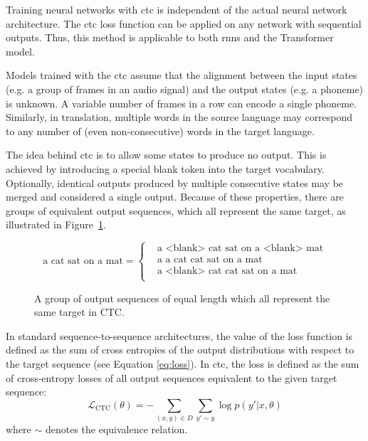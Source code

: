 Training neural networks with \ac{ctc} is independent of the actual neural
network architecture. The \ac{ctc} loss function can be applied on any network
with sequential outputs. Thus, this method is applicable to both \acp{rnn} and
the Transformer model.

Models trained with the \ac{ctc} assume that the alignment between the input
states (e.g. a group of frames in an audio signal) and the output states
(e.g. a phoneme) is unknown. A variable number of frames in a row can encode a
single phoneme. Similarly, in translation, multiple words in the source
language may correspond to any number of (even non-consecutive) words in the
target language.

The idea behind \ac{ctc} is to allow some states to produce no output. This is
achieved by introducing a special blank token into the target vocabulary.
Optionally, identical outputs produced by multiple consecutive states may be
merged and considered a single output. Because of these properties, there are
groups of equivalent output sequences, which all represent the same target, as
illustrated in Figure~\ref{fig:ctc-equivalent-sequences}.

\begin{figure}
  \centering
  \begin{minipage}{\textwidth}
    \begin{equation*}
        \text{a cat sat on a mat} =
        \begin{cases}
          & \text{a <blank> cat sat on a <blank> mat} \\
          & \text{a a cat cat sat on a mat} \\
          & \text{a <blank> cat cat sat on a mat} \\
        \end{cases}
    \end{equation*}
  \end{minipage}
  \caption{A group of output sequences of equal length which all represent the
    same target in CTC.} %
  \label{fig:ctc-equivalent-sequences}
\end{figure}

In standard sequence-to-sequence architectures, the value of the loss function
is defined as the sum of cross entropies of the output distributions with
respect to the target sequence (see Equation \ref{eq:loss}). In \ac{ctc}, the
loss is defined as the sum of cross-entropy losses of all output sequences
equivalent to the given target sequence:
%
\begin{equation}
  \mathcal{L}_{\text{CTC}}({\theta}) = - \sum_{(x, y) \in D} \sum_{y' \sim y}  \log p(y' | x, \theta)
  \label{eq:ctc-loss}
\end{equation}
%
where $\sim$ denotes the equivalence relation.

